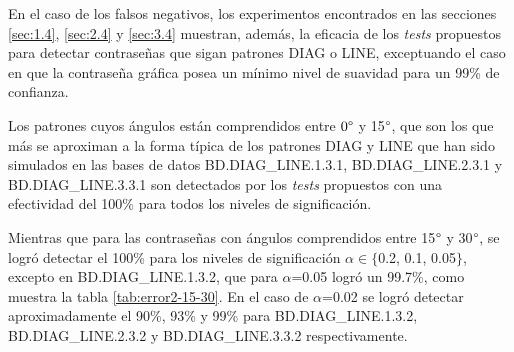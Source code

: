 \documentclass[12pt]{report}
\begin{document}
En el caso de los falsos negativos, los experimentos encontrados en las secciones \ref{sec:1.4}, \ref{sec:2.4} y \ref{sec:3.4} muestran, además, la eficacia de los \textit{tests} propuestos  para detectar contraseñas que sigan patrones DIAG o LINE, exceptuando el caso en que la contraseña gráfica posea un mínimo nivel de suavidad para un 99\% de confianza.

Los patrones cuyos ángulos están comprendidos entre $0\degree$ y 15$\degree$, que son los que más se aproximan a la forma típica de los patrones DIAG y LINE que han sido simulados en las bases de datos BD.DIAG\_LINE.1.3.1, BD.DIAG\_LINE.2.3.1 y BD.DIAG\_LINE.3.3.1 son detectados por los \textit{tests} propuestos con una efectividad del 100\% para todos los niveles de significación.



Mientras que para las contraseñas con ángulos comprendidos entre 15$\degree$ y 30$\degree$, se logró detectar el 100\% para los niveles de significación $\alpha \in \{$0.2, 0.1, 0.05$\}$, excepto en BD.DIAG\_LINE.1.3.2, que para $\alpha$=0.05 logró un 99.7\%, como muestra la tabla \ref{tab:error2-15-30}. En el caso de $\alpha$=0.02 se logró detectar aproximadamente el 90\%, 93\% y 99\% para BD.DIAG\_LINE.1.3.2, BD.DIAG\_LINE.2.3.2 y BD.DIAG\_LINE.3.3.2 respectivamente.
\end{document}
